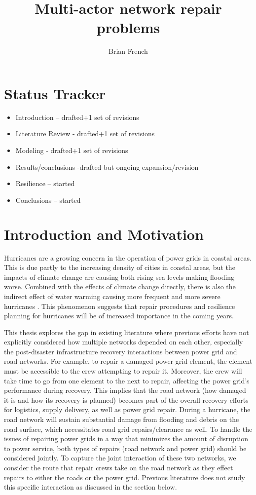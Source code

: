 \documentclass{article}
\begin{document}
	\title{Multi-actor network repair problems}
	\author{Brian French}
	\maketitle
	\section{Status Tracker}
	\begin{itemize}
		\item Introduction -- drafted+1 set of revisions
		\item Literature Review - drafted+1 set of revisions
		\item Modeling - drafted+1 set of revisions
		\item Results/conclusions -drafted but ongoing expansion/revision
		\item Resilience -- started
		\item Conclusions -- started
	\end{itemize}
	\doublespacing
	\section{Introduction and Motivation}
	Hurricanes are a growing concern in the operation of power grids in coastal areas. This is due partly to the increasing density of cities in coastal areas, but the impacts of climate change are causing both rising sea levels making flooding worse. Combined with the effects of climate change directly, there is also the indirect effect of water warming causing more frequent and more severe hurricanes \cite{MannEA2006}. This phenomenon suggests that repair procedures and resilience planning for hurricanes will be of increased importance in the coming years.
	
	This thesis explores the gap in existing literature where previous efforts have not explicitly considered how multiple networks depended on each other, especially the post-disaster infrastructure recovery interactions between power grid and road networks. For example, to repair a damaged power grid element, the element must be accessible to the crew attempting to repair it. Moreover, the crew will take time to go from one element to the next to repair, affecting the power grid's performance during recovery. This implies that the road network (how damaged it is and how its recovery is planned) becomes part of the overall recovery efforts for logistics, supply delivery, as well as power grid repair. During a hurricane, the road network will sustain substantial damage from flooding and debris on the road surface, which necessitates road grid repairs/clearance as well. To handle the issues of repairing power grids in a way that minimizes the amount of disruption to power service, both types of repairs (road network and power grid) should be considered jointly. To capture the joint interaction of these two networks, we consider the route that repair crews take on the road network as they effect repairs to either the roads or the power grid. Previous literature does not study this specific interaction as discussed in the section below.
\end{document}

